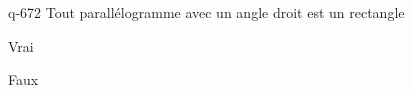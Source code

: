 \begin{truefalse}{q-672}
 Tout parallélogramme avec un angle droit est un rectangle
\item* Vrai
\item Faux
\end{truefalse}

